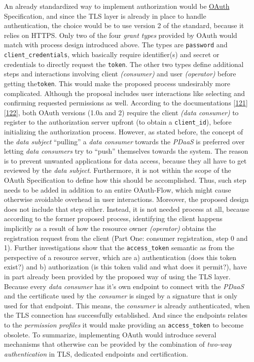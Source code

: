 \documentclass[12pt,english,a4paper,titlepage,cleardoublepage=empty,dottedtoc]{report}
\begin{document}
An already standardized way to implement authorization would be
\protect\hyperlink{link_oauth}{OAuth} Specification, and since the TLS
layer is already in place to handle authentication, the choice would be
to use version 2 of the standard, because it relies on HTTPS. Only two
of the four \emph{grant types} provided by OAuth would match with
process design introduced above. The types are \texttt{password} and
\texttt{client\_credentials}, which basically require identifier(s) and
secret or credentials to directly request the \texttt{token}. The other
two types define additional steps and interactions involving client
\emph{(consumer)} and user \emph{(operator)} before getting
the\texttt{token}. This would make the proposed process undesirably more
complicated. Although the proposal includes user interactions like
selecting and confirming requested permissions as well. According to the
documentations
{[}\protect\hyperlink{ref-web_spec_oauth-1a_client-reg}{121}{]}
{[}\protect\hyperlink{ref-web_spec_oauth-2_client-reg}{122}{]}, both
OAuth versions (1.0a and 2) require the client \emph{(data consumer)} to
register to the authorization server upfront (to obtain a
\texttt{client\_id}), before initializing the authorization process.
However, as stated before, the concept of the \emph{data subject}
``pulling'' a \emph{data consumer} towards the \emph{PDaaS} is preferred
over letting \emph{data consumers} try to ``push'' themselves towards
the system. The reason is to prevent unwanted applications for data
access, because they all have to get reviewed by the \emph{data
subject}. Furthermore, it is not within the scope of the OAuth
Specification to define how this should be accomplished. Thus, such step
needs to be added in addition to an entire OAuth-Flow, which might cause
otherwise avoidable overhead in user interactions. Moreover, the
proposed design does not include that step either. Instead, it is not
needed process at all, because according to the former proposed process,
identifying the client happens implicitly as a result of how the
resource owner \emph{(operator)} obtains the registration request from
the client (Part One: consumer registration, step 0 and 1). Further
investigations show that the \texttt{access\_token} semantic as from the
perspective of a resource server, which are a) authentication (does this
token exist?) and b) authorization (is this token valid and what does it
permit?), have in part already been provided by the proposed way of
using the TLS layer. Because every \emph{data consumer} has it's own
endpoint to connect with the \emph{PDaaS} and the certificate used by
the \emph{consumer} is singed by a signature that is only used for that
endpoint. This means, the \emph{consumer} is already authenticated, when
the TLS connection has successfully established. And since the endpoints
relates to the \emph{permission profiles} it would make providing an
\texttt{access\_token} to become obsolete. To summarize, implementing
OAuth would introduce several mechanisms that otherwise can be provided
by the combination of \emph{two-way authentication} in TLS, dedicated
endpoints and certification.
\end{document}
